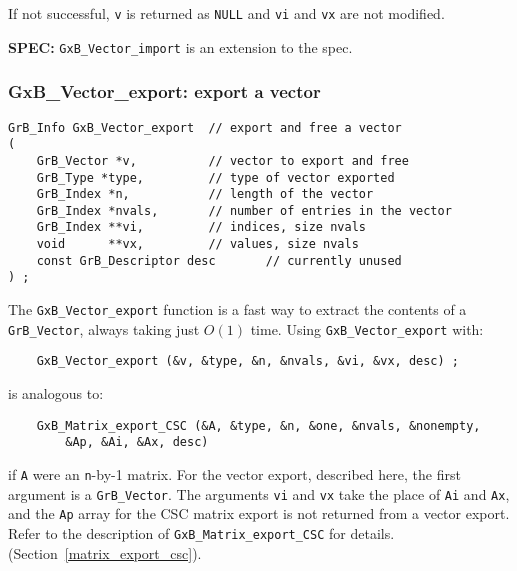\documentclass[12pt]{article}
\begin{document}
If not successful, \verb'v' is returned as \verb'NULL' and \verb'vi' and
\verb'vx' are not modified.

\begin{spec}
{\bf SPEC:} \verb'GxB_Vector_import' is an extension to the spec.
\end{spec}

\newpage
\subsubsection{{\sf GxB\_Vector\_export:}        export a vector}
\label{vector_export}

\begin{mdframed}[userdefinedwidth=6in]
{\footnotesize
\begin{verbatim}
GrB_Info GxB_Vector_export  // export and free a vector
(
    GrB_Vector *v,          // vector to export and free
    GrB_Type *type,         // type of vector exported
    GrB_Index *n,           // length of the vector
    GrB_Index *nvals,       // number of entries in the vector
    GrB_Index **vi,         // indices, size nvals
    void      **vx,         // values, size nvals
    const GrB_Descriptor desc       // currently unused
) ;
\end{verbatim}
} \end{mdframed}

The \verb'GxB_Vector_export' function is a fast way to extract the contents of
a \verb'GrB_Vector', always taking just $O(1)$ time.  Using
\verb'GxB_Vector_export' with:

{\footnotesize
\begin{verbatim}
    GxB_Vector_export (&v, &type, &n, &nvals, &vi, &vx, desc) ;
\end{verbatim}}

is analogous to:

{\footnotesize
\begin{verbatim}
    GxB_Matrix_export_CSC (&A, &type, &n, &one, &nvals, &nonempty,
        &Ap, &Ai, &Ax, desc)
\end{verbatim}}

\noindent
if \verb'A' were an \verb'n'-by-1 matrix.  For the vector export, described
here, the first argument is a \verb'GrB_Vector'.  The arguments \verb'vi' and
\verb'vx' take the place of \verb'Ai' and \verb'Ax', and the \verb'Ap' array
for the CSC matrix export is not returned from a vector export.  Refer to the
description of \verb'GxB_Matrix_export_CSC' for details.
(Section~\ref{matrix_export_csc}).
\end{document}
